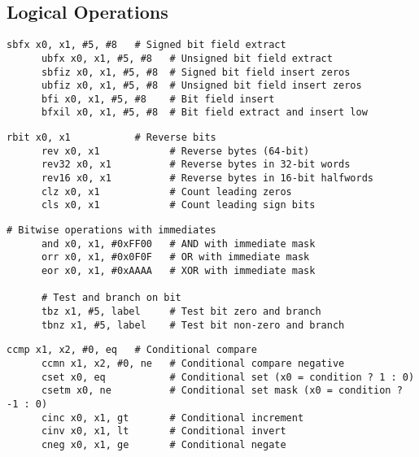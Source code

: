 \subsection{Logical Operations}

  \begin{definition}
    \begin{lstlisting}[language=arm]
      sbfx x0, x1, #5, #8   # Signed bit field extract
      ubfx x0, x1, #5, #8   # Unsigned bit field extract  
      sbfiz x0, x1, #5, #8  # Signed bit field insert zeros
      ubfiz x0, x1, #5, #8  # Unsigned bit field insert zeros
      bfi x0, x1, #5, #8    # Bit field insert
      bfxil x0, x1, #5, #8  # Bit field extract and insert low
    \end{lstlisting}
  \end{definition}

  \begin{definition}
    \begin{lstlisting}[language=arm]
      rbit x0, x1           # Reverse bits
      rev x0, x1            # Reverse bytes (64-bit)
      rev32 x0, x1          # Reverse bytes in 32-bit words
      rev16 x0, x1          # Reverse bytes in 16-bit halfwords
      clz x0, x1            # Count leading zeros
      cls x0, x1            # Count leading sign bits
    \end{lstlisting}
  \end{definition}

  \begin{definition}
    \begin{lstlisting}[language=arm]
      # Bitwise operations with immediates
      and x0, x1, #0xFF00   # AND with immediate mask
      orr x0, x1, #0x0F0F   # OR with immediate mask
      eor x0, x1, #0xAAAA   # XOR with immediate mask
      
      # Test and branch on bit
      tbz x1, #5, label     # Test bit zero and branch
      tbnz x1, #5, label    # Test bit non-zero and branch
    \end{lstlisting}
  \end{definition}

  \begin{definition}
    \begin{lstlisting}[language=arm]
      ccmp x1, x2, #0, eq   # Conditional compare
      ccmn x1, x2, #0, ne   # Conditional compare negative
      cset x0, eq           # Conditional set (x0 = condition ? 1 : 0)
      csetm x0, ne          # Conditional set mask (x0 = condition ? -1 : 0)
      cinc x0, x1, gt       # Conditional increment
      cinv x0, x1, lt       # Conditional invert
      cneg x0, x1, ge       # Conditional negate
    \end{lstlisting}
  \end{definition}

